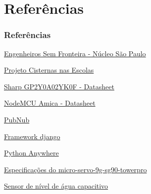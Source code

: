 \documentclass{beamer}
\begin{document}
\section{Referências}
\begin{frame}
	\frametitle{Referências}
	\begin{thebibliography}{5}
		
		
		\href{http://www.esfsaopaulo.org/}{Engenheiros Sem Fronteira - Núcleo São Paulo}
		
		\href{http://www.esfsaopaulo.org/projetos}{Projeto Cisternas nas Escolas}
		
		\href{https://www.pololu.com/file/0J156/gp2y0a02yk_e.pdf}{Sharp GP2Y0A02YK0F - Datasheet}
		
		\href{https://github.com/nodemcu/nodemcu-devkit-v1.0/blob/master/NODEMCU_DEVKIT_V1.0.PDF}{NodeMCU Amica - Datasheet}
		
		\href{https://www.pubnub.com/}{PubNub}
		
		\href{https://www.djangoproject.com/}{Framework django}
		
		\href{https://www.pythonanywhere.com/}{Python Anywhere}
		
		\href{https://www.filipeflop.com/produto/micro-servo-9g-sg90-towerpro/}{Especificações do micro-servo-9g-sg90-towerpro}
				
		\href{http://www.instructables.com/id/Capacitive-Fluid-Level-Sensor/}{Sensor de nível de água capacitivo}
		
		
		
		
	\end{thebibliography}
	
\end{frame}
\end{document}

